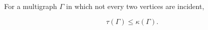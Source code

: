For a multigraph $\Gamma$ in which not every two vertices are incident,

$$\tau(\Gamma) \leq \kappa(\Gamma).$$
